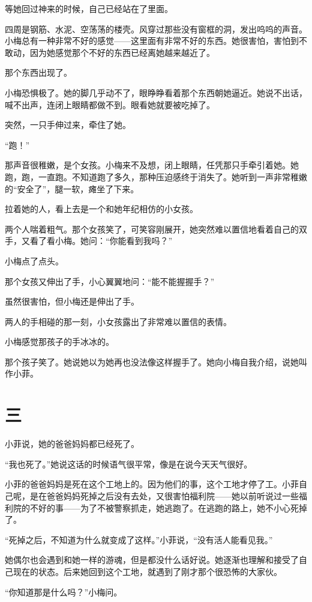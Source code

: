 \documentclass[12pt,a4paper]{ctexart}
\begin{document}
等她回过神来的时候，自己已经站在了里面。

四周是钢筋、水泥、空荡荡的楼壳。风穿过那些没有窗框的洞，发出呜呜的声音。小梅总有一种非常不好的感觉——这里面有非常不好的东西。她很害怕，害怕到不敢动，因为她感觉那个不好的东西已经离她越来越近了。

那个东西出现了。

小梅恐惧极了。她的脚几乎动不了，眼睁睁看着那个东西朝她逼近。她说不出话，喊不出声，连闭上眼睛都做不到。眼看她就要被吃掉了。

突然，一只手伸过来，牵住了她。

“跑！”

那声音很稚嫩，是个女孩。小梅来不及想，闭上眼睛，任凭那只手牵引着她。她跑，跑，一直跑。不知道跑了多久，那种压迫感终于消失了。她听到一声非常稚嫩的“安全了”，腿一软，瘫坐了下来。

拉着她的人，看上去是一个和她年纪相仿的小女孩。

两个人喘着粗气。那个女孩笑了，可笑容刚展开，她突然难以置信地看着自己的双手，又看了看小梅。她问：“你能看到我吗？”

小梅点了点头。

那个女孩又伸出了手，小心翼翼地问：“能不能握握手？”

虽然很害怕，但小梅还是伸出了手。

两人的手相碰的那一刻，小女孩露出了非常难以置信的表情。

小梅感觉那孩子的手冰冰的。

那个孩子笑了。她说她以为她再也没法像这样握手了。她向小梅自我介绍，说她叫作小菲。

\section*{三}

小菲说，她的爸爸妈妈都已经死了。

“我也死了。”她说这话的时候语气很平常，像是在说今天天气很好。

小菲的爸爸妈妈是死在这个工地上的。因为他们的事，这个工地才停了工。小菲自己呢，是在爸爸妈妈死掉之后没有去处，又很害怕福利院——她以前听说过一些福利院的不好的事——为了不被警察抓走，她逃跑了。在逃跑的路上，她不小心死掉了。

“死掉之后，不知道为什么就变成了这样。”小菲说，“没有活人能看见我。”

她偶尔也会遇到和她一样的游魂，但是都没什么话好说。她逐渐也理解和接受了自己现在的状态。后来她回到这个工地，就遇到了刚才那个很恐怖的大家伙。

“你知道那是什么吗？”小梅问。
\end{document}
